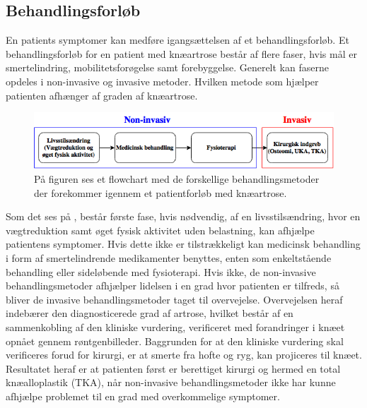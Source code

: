 \subsection*{Behandlingsforløb}
En patients symptomer kan medføre igangsættelsen af et behandlingsforløb. Et behandlingsforløb for en patient med knæartrose består af flere faser, hvis mål er smertelindring, mobilitetsforøgelse samt forebyggelse. Generelt kan faserne opdeles i non-invasive og invasive metoder. Hvilken metode som hjælper patienten afhænger af graden af knæartrose.

\begin{figure}[H]
	\centering
	\includegraphics[width=1\textwidth]{figures/bProblemanalyse/flowchart_behandlingsforloeb.png}
	\caption{På figuren ses et flowchart med de forskellige behandlingsmetoder der forekommer igennem et patientforløb med knæartrose.}
	\label{fig:flow_behandlingsfaser}
\end{figure}\vspace{-.25cm}

Som det ses på , består første fase, hvis nødvendig, af en livsstilsændring, hvor en vægtreduktion samt øget fysisk aktivitet uden belastning, kan afhjælpe patientens symptomer. Hvis dette ikke er tilstrækkeligt kan medicinsk behandling i form af smertelindrende medikamenter benyttes, enten som enkeltstående behandling eller sideløbende med fysioterapi. Hvis ikke, de non-invasive behandlingsmetoder afhjælper lidelsen i en grad hvor patienten er tilfreds, så bliver de invasive behandlingsmetoder taget til overvejelse. Overvejelsen heraf indebærer den diagnosticerede grad af artrose, hvilket består af en sammenkobling af den kliniske vurdering, verificeret med forandringer i knæet opnået gennem røntgenbilleder. Baggrunden for at den kliniske vurdering skal verificeres forud for kirurgi, er at smerte fra hofte og ryg, kan projiceres til knæet. Resultatet heraf er at patienten først er berettiget kirurgi og hermed en total knæalloplastik (TKA), når non-invasive behandlingsmetoder ikke har kunne afhjælpe problemet til en grad med overkommelige symptomer. \citep{Lind2016b} \citep{brostrom2012} \citep{skou2016}


